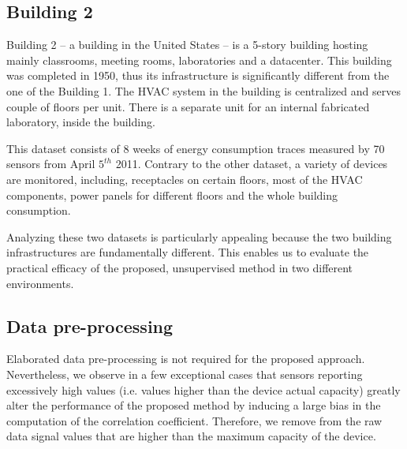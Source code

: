 
\subsection{Building 2}
Building 2 -- a building in the United States -- is a 5-story building hosting mainly classrooms, meeting rooms, laboratories and a datacenter.
This building was completed in 1950, thus its infrastructure is significantly different from the one of the Building 1.
The HVAC system in the building is centralized and serves couple of floors per unit.
There is a separate unit for an internal fabricated laboratory, inside the building.

This dataset consists of 8 weeks of energy consumption traces measured by 70 sensors from April $5^{th}$ 2011.
Contrary to the other dataset, a variety of devices are monitored, including, receptacles on certain floors, most of the HVAC components, 
 power panels for different floors and the whole building consumption.

Analyzing these two datasets is particularly appealing because the two building infrastructures are fundamentally different. 
This enables us to evaluate the practical efficacy of the proposed, unsupervised method in two different environments.


\subsection{Data pre-processing}
Elaborated data pre-processing is not required for the proposed approach.
Nevertheless, we observe in a few exceptional cases that sensors reporting excessively high values (i.e. values higher than the device actual capacity) greatly alter the performance of the proposed method by inducing a large bias in the computation of the correlation coefficient.
Therefore, we remove from the raw data signal values that are higher than the maximum capacity of the device.


